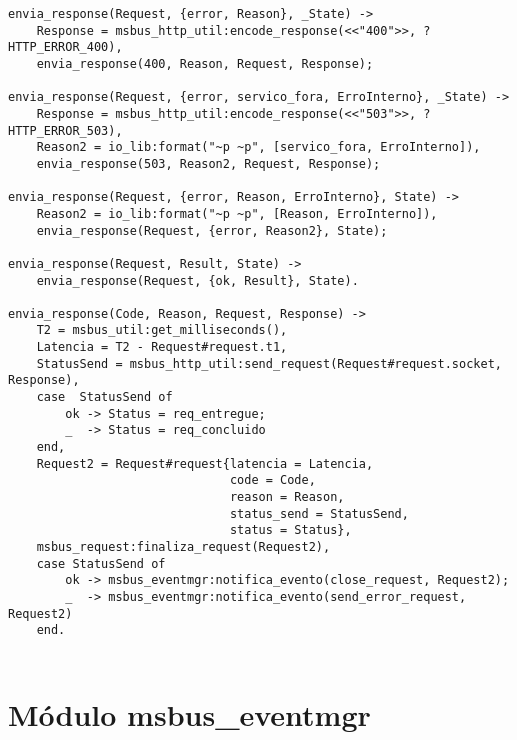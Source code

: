 \begin{lstlisting}
envia_response(Request, {error, Reason}, _State) ->
	Response = msbus_http_util:encode_response(<<"400">>, ?HTTP_ERROR_400),
	envia_response(400, Reason, Request, Response);

envia_response(Request, {error, servico_fora, ErroInterno}, _State) ->
	Response = msbus_http_util:encode_response(<<"503">>, ?HTTP_ERROR_503),
	Reason2 = io_lib:format("~p ~p", [servico_fora, ErroInterno]),
	envia_response(503, Reason2, Request, Response);

envia_response(Request, {error, Reason, ErroInterno}, State) ->
	Reason2 = io_lib:format("~p ~p", [Reason, ErroInterno]),
	envia_response(Request, {error, Reason2}, State);

envia_response(Request, Result, State) ->
	envia_response(Request, {ok, Result}, State).

envia_response(Code, Reason, Request, Response) ->
	T2 = msbus_util:get_milliseconds(),
	Latencia = T2 - Request#request.t1,
	StatusSend = msbus_http_util:send_request(Request#request.socket, Response),
	case  StatusSend of
		ok -> Status = req_entregue;
		_  -> Status = req_concluido
	end,
	Request2 = Request#request{latencia = Latencia, 
	                           code = Code, 
	                           reason = Reason, 
	                           status_send = StatusSend, 
	                           status = Status},
	msbus_request:finaliza_request(Request2),
	case StatusSend of
		ok -> msbus_eventmgr:notifica_evento(close_request, Request2);
		_  -> msbus_eventmgr:notifica_evento(send_error_request, Request2)
	end.
	
\end{lstlisting}


\section{Módulo msbus\_eventmgr}


